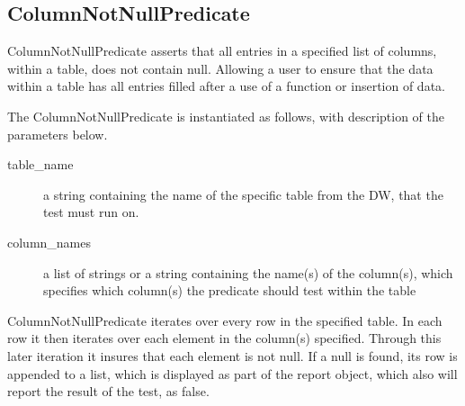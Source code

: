\subsection{ColumnNotNullPredicate}
ColumnNotNullPredicate asserts that all entries in a specified list of columns, within a table, does not contain null. Allowing a user to ensure that the data within a table has all entries filled after a use of a function or insertion of data.

The ColumnNotNullPredicate is instantiated as follows, with description of the parameters below.


\begin{description}
\item [table\_name] a string containing the name of the specific table from the DW, that the test must run on. 
\item [column\_names] a list of strings or a string containing the name(s) of the column(s), which specifies which column(s) the predicate should test within the table
\end{description}

ColumnNotNullPredicate iterates over every row in the specified table. In each row it then iterates over each element in the column(s) specified. Through this later iteration it insures that each element is not null. If a null is found, its row is appended to a list, which is displayed as part of the report object, which also will report the result of the test, as false.
